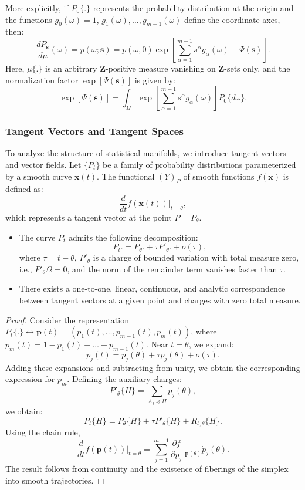 More explicitly, if $P_0\{.\}$ represents the probability distribution at the origin and the functions $g_0(\omega) = 1$, $g_1(\omega),\dots,g_{m-1}(\omega)$ define the coordinate axes, then:
\[
\frac{dP_{\mathbf{s}}}{d\mu}(\omega) 
= p(\omega;\mathbf{s}) = p(\omega, 0)\exp \left[\sum_{\alpha=1}^{m-1} s^{\alpha} g_{\alpha} (\omega) - \Psi(\mathbf{s})  \right].
\]
Here, $\mu\{.\}$ is an arbitrary $\mathbf{Z}$-positive measure vanishing on $\mathbf{Z}$-sets only, and the normalization factor $\exp[\Psi(\mathbf{s})]$ is given by:
\[
\exp[ \Psi(\mathbf{s})] = \int_{\Omega}\exp \left[ \sum_{\alpha = 1}^{m-1}  s^{\alpha} g_{\alpha} (\omega) \right] P_0\{ d \omega\}.
\]

\subsubsection{Tangent Vectors and Tangent Spaces}
To analyze the structure of statistical manifolds, we introduce tangent vectors and vector fields. Let $\{P_t\}$ be a family of probability distributions parameterized by a smooth curve $\mathbf{x}(t)$. The functional $(Y)_{P}$ of smooth functions $f(\mathbf{x})$ is defined as:
\[
\frac{d}{dt}f(\mathbf{x}(t)) \bigg|_{t =\theta},
\]
which represents a tangent vector at the point $P=P_{\theta}$.

\begin{lemma}
    \begin{itemize}
        \item The curve $P_t$ admits the following decomposition:
        \[
        P_t{.} = P_{\theta}{.} + \tau P'_{\theta}{.}+ o(\tau),
        \]
        where $\tau = t - \theta$, $P'_{\theta}$ is a charge of bounded variation with total measure zero, i.e., $P'_{\theta} {\Omega} =0$, and the norm of the remainder term vanishes faster than $\tau$.
        \item There exists a one-to-one, linear, continuous, and analytic correspondence between tangent vectors at a given point and charges with zero total measure.
    \end{itemize}
\end{lemma}

\begin{proof}
    Consider the representation $P_t\{.\} \leftrightarrow \mathbf{p}(t) = (p_1(t),\dots,p_{m-1}(t),p_m(t))$, where $p_m(t)= 1 - p_1(t) - \dots - p_{m-1}(t)$. Near $t = \theta$, we expand:
    \[
    p_j(t) = p_j(\theta) + \tau \dot{p}_j(\theta) + o(\tau).
    \]
    Adding these expansions and subtracting from unity, we obtain the corresponding expression for $p_m$. Defining the auxiliary charges:
    \[
    P'_{\theta} \{H\} = \sum_{A_j \preceq H} \dot{p}_j (\theta),
    \]
    we obtain:
    \[
    P_t\{H\}= P_{\theta}\{H\}+ \tau P'_{\theta}\{H\} + R_{t,\theta}\{H\}.
    \]
    Using the chain rule,
    \[
    \frac{d}{dt}f(\mathbf{p}(t))\bigg|_{t= \theta} = \sum_{j=1}^{m-1} \frac{\partial f}{\partial p_j} \bigg|_{\mathbf{p}(\theta)} \dot{p}_j(\theta).
    \]
    The result follows from continuity and the existence of fiberings of the simplex into smooth trajectories.
\end{proof}

